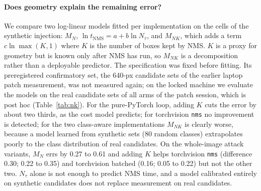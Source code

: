 \documentclass[a4paper,fleqn]{cas-dc}
\newcommand{\Ntau}{N_{\tau}}
\begin{document}
\paragraph{Does geometry explain the remaining error?}
\label{sec:nk}
We compare two log-linear models fitted per implementation on the cells of the synthetic injection: $M_N$, $\ln t_{\mathrm{NMS}} = a + b\ln\Ntau$, and $M_{NK}$, which adds a term $c\ln\max(K,1)$ where $K$ is the number of boxes kept by NMS. $K$ is a proxy for geometry but is known only after NMS has run, so $M_{NK}$ is a decomposition rather than a deployable predictor. The specification was fixed before fitting. Its preregistered confirmatory set, the 640-px candidate sets of the earlier laptop patch measurement, was not measured again; on the locked machine we evaluate the models on the real candidate sets of all arms of the patch session, which is post hoc (Table~\ref{tab:nk}). For the pure-PyTorch loop, adding $K$ cuts the error by about two thirds, as the cost model predicts; for torchvision \texttt{nms} no improvement is detected; for the two class-aware implementations $M_{NK}$ is clearly worse, because a model learned from synthetic sets (80 random classes) extrapolates poorly to the class distribution of real candidates. On the whole-image attack variants, $M_N$ errs by 0.27 to 0.61 and adding $K$ helps torchvision \texttt{nms} (difference 0.30; 0.22 to 0.35) and torchvision batched (0.16; 0.05 to 0.22) but not the other two. $\Ntau$ alone is not enough to predict NMS time, and a model calibrated entirely on synthetic candidates does not replace measurement on real candidates.


\end{document}
